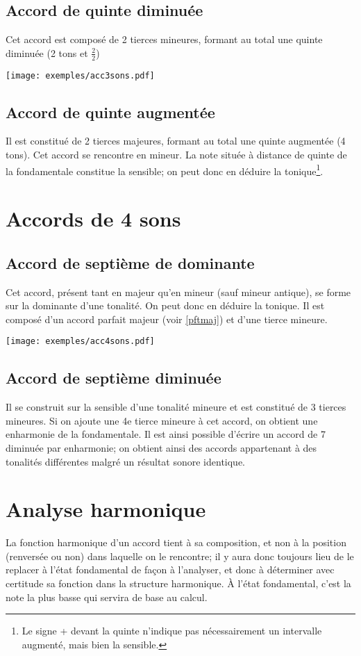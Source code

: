 \documentclass[11pt,a4paper]{scrreprt}
\begin{document}
\subsection{Accord de quinte diminuée}
Cet accord est composé de 2 tierces mineures, formant au total une quinte diminuée (2 tons et $\frac2 2$)
\begin{center}
   \texttt{[image: exemples/acc3sons.pdf]}
\end{center}
\subsection{Accord de quinte augmentée}
Il est constitué de 2 tierces majeures, formant au total une quinte augmentée (4 tons). Cet accord se rencontre en mineur. La note située à distance de quinte de la fondamentale constitue la sensible; on peut donc en déduire la tonique\footnote{Le signe + devant la quinte n'indique pas nécessairement un intervalle augmenté, mais bien la sensible.}.
\section{Accords de 4 sons}
\subsection{Accord de septième de dominante}
Cet accord, présent tant en majeur qu'en mineur (sauf mineur antique), se forme sur la dominante d'une tonalité. On peut donc en déduire la tonique. Il est composé d'un accord parfait majeur (voir \ref{pftmaj}) et d'une tierce mineure.
\begin{center}
   \texttt{[image: exemples/acc4sons.pdf]}
\end{center}
\subsection{Accord de septième diminuée}
Il se construit sur la sensible d'une tonalité mineure et est constitué de 3 tierces mineures. Si on ajoute une 4e tierce mineure à cet accord, on obtient une enharmonie de la fondamentale. Il est ainsi possible d'écrire un accord de 7\ieme{} diminuée par enharmonie; on obtient ainsi des accords appartenant à des tonalités différentes malgré un résultat sonore identique.
\section{Analyse harmonique}
La fonction harmonique d'un accord tient à sa composition, et non à la position (renversée ou non) dans laquelle on le rencontre; il y aura donc toujours lieu de le replacer à l'état fondamental de façon à l'analyser, et donc à déterminer avec certitude sa fonction dans la structure harmonique. À l'état fondamental, c'est la note la plus basse qui servira de base au calcul.
\end{document}
